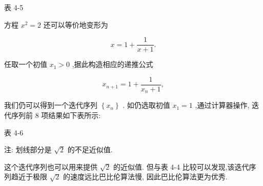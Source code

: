\documentclass[10pt]{article}
\begin{document}
表 4-5

\begin{center}
\end{center}

方程 \({x}^{2} = 2\) 还可以等价地变形为

\[
x = 1 + \frac{1}{x + 1}.
\]

任取一个初值 \({x}_{1} > 0\) ,据此构造相应的递推公式

\[
{x}_{n + 1} = 1 + \frac{1}{{x}_{n} + 1},
\]

我们仍可以得到一个迭代序列 \(\left\{  {x}_{n}\right\}\) . 如仍选取初值 \({x}_{1} = 1\) ,通过计算器操作, 迭代序列前 8 项结果如下表所示:

表 4-6

\begin{center}
\end{center}

注: 划线部分是 \(\sqrt{2}\) 的不足近似值.

这个迭代序列也可以用来提供 \(\sqrt{2}\) 的近似值. 但与表 4-4 比较可以发现,该迭代序列趋近于极限 \(\sqrt{2}\) 的速度远比巴比伦算法慢, 因此巴比伦算法更为优秀.
\end{document}
